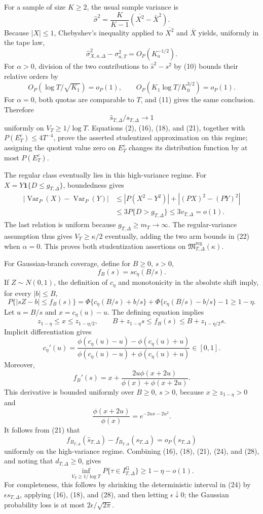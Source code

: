 For a sample of size \(K\geq2\), the usual sample variance is
\[
 \widehat\sigma^2=\frac{K}{K-1}(\overline{X^2}-\bar X^2).
\]
Because \(|X|\leq1\), Chebyshev's inequality applied to \(\overline{X^2}\) and \(\bar X\) yields, uniformly in the tape law,
\[
 \widehat\sigma_{X,a,\Delta}^2-\sigma_{a,T}^2=O_P(K_a^{-1/2}). \tag{19}
\]
For \(\alpha>0\), division of the two contributions to \(\widehat s^2-s^2\) by (10) bounds their relative orders by
\[
 O_P(\log T/\sqrt{K_1})=o_P(1),\qquad
 O_P(K_1\log T/K_0^{3/2})=o_P(1). \tag{20}
\]
For \(\alpha=0\), both quotas are comparable to \(T\), and (11) gives the same conclusion.  Therefore
\[
 \widehat s_{T,\Delta}/s_{T,\Delta}\longrightarrow1 \tag{21}
\]
uniformly on \(V_T\geq1/\log T\).  Equations (2), (16), (18), and (21), together with \(P(E_T^c)\leq4T^{-4}\), prove the asserted studentized approximation on this regime; assigning the quotient value zero on \(E_T^c\) changes its distribution function by at most \(P(E_T^c)\).

The regular class eventually lies in this high-variance regime.  For \(X=Y\mathbf 1\{D\leq g_{T,\Delta}\}\), boundedness gives
\[
 \begin{aligned}
 |\operatorname{Var}_P(X)-\operatorname{Var}_P(Y)|
 &\leq|P(X^2-Y^2)|+|(PX)^2-(PY)^2|\\
 &\leq3P\{D>g_{T,\Delta}\}\leq3v_{T,\Delta}=o(1).
 \end{aligned} \tag{22}
\]
The last relation is uniform because \(g_{T,\Delta}\geq m_T\to\infty\).  The regular-variance assumption thus gives \(V_T\geq\kappa/2\) eventually, adding the two arm bounds in (22) when \(\alpha=0\).  This proves both studentization assertions on \(\mathfrak M_{T,\Delta}^{\mathrm{reg}}(\kappa)\).

For Gaussian-branch coverage, define for \(B\geq0\), \(s>0\),
\[
 f_B(s)=s c_\eta(B/s). \tag{23}
\]
If \(Z\sim N(0,1)\), the definition of \(c_\eta\) and monotonicity in the absolute shift imply, for every \(|b|\leq B\),
\[
 P\{|sZ-b|\leq f_B(s)\}
 =\Phi\{c_\eta(B/s)+b/s\}+\Phi\{c_\eta(B/s)-b/s\}-1
 \geq1-\eta. \tag{24}
\]
Let \(u=B/s\) and \(x=c_\eta(u)-u\).  The defining equation implies
\[
 z_{1-\eta}\leq x\leq z_{1-\eta/2},\qquad
 B+z_{1-\eta}s\leq f_B(s)\leq B+z_{1-\eta/2}s. \tag{25}
\]
Implicit differentiation gives
\[
 c_\eta'(u)=
 \frac{\phi(c_\eta(u)-u)-\phi(c_\eta(u)+u)}
 {\phi(c_\eta(u)-u)+\phi(c_\eta(u)+u)}\in[0,1]. \tag{26}
\]
Moreover,
\[
 f_B'(s)=x+\frac{2u\phi(x+2u)}{\phi(x)+\phi(x+2u)}. \tag{27}
\]
This derivative is bounded uniformly over \(B\geq0\), \(s>0\), because \(x\geq z_{1-\eta}>0\) and
\[
 \frac{\phi(x+2u)}{\phi(x)}=e^{-2ux-2u^2}.
\]
It follows from (21) that
\[
 f_{B_{T,\Delta}}(\widehat s_{T,\Delta})
 -f_{B_{T,\Delta}}(s_{T,\Delta})=o_P(s_{T,\Delta}) \tag{28}
\]
uniformly on the high-variance regime.  Combining (16), (18), (21), (24), and (28), and noting that \(d_{T,\Delta}\geq0\), gives
\[
 \inf_{V_T\geq1/\log T}P\{\tau\in I_{T,\Delta}^{\mathrm G}\}
 \geq1-\eta-o(1). \tag{29}
\]
For completeness, this follows by shrinking the deterministic interval in (24) by \(\epsilon s_{T,\Delta}\), applying (16), (18), and (28), and then letting \(\epsilon\downarrow0\); the Gaussian probability loss is at most \(2\epsilon/\sqrt{2\pi}\).

